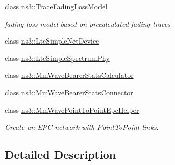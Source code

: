 \begin{DoxyCompactItemize}
class \hyperlink{classns3_1_1TraceFadingLossModel}{ns3\+::\+Trace\+Fading\+Loss\+Model}
\begin{DoxyCompactList}\small\item\em fading loss model based on precalculated fading traces \end{DoxyCompactList}\item 
class \hyperlink{classns3_1_1LteSimpleNetDevice}{ns3\+::\+Lte\+Simple\+Net\+Device}
\item 
class \hyperlink{classns3_1_1LteSimpleSpectrumPhy}{ns3\+::\+Lte\+Simple\+Spectrum\+Phy}
\item 
class \hyperlink{classns3_1_1MmWaveBearerStatsCalculator}{ns3\+::\+Mm\+Wave\+Bearer\+Stats\+Calculator}
\item 
class \hyperlink{classns3_1_1MmWaveBearerStatsConnector}{ns3\+::\+Mm\+Wave\+Bearer\+Stats\+Connector}
\item 
class \hyperlink{classns3_1_1MmWavePointToPointEpcHelper}{ns3\+::\+Mm\+Wave\+Point\+To\+Point\+Epc\+Helper}
\begin{DoxyCompactList}\small\item\em Create an E\+PC network with Point\+To\+Point links. \end{DoxyCompactList}\end{DoxyCompactItemize}


\subsection{Detailed Description}
